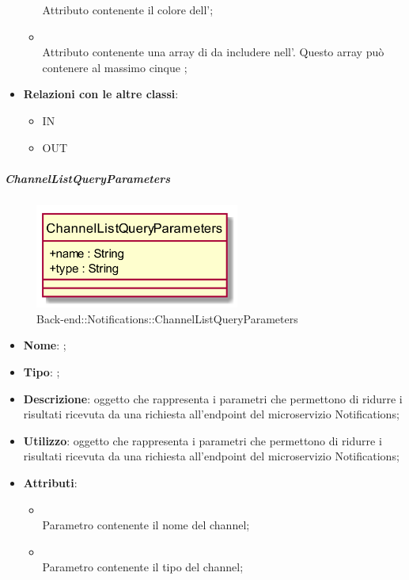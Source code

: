 \begin{itemize}
\begin{itemize}
		Attributo contenente il colore dell';
		\item[]  \\
		Attributo contenente una array di  da includere nell'. Questo array può contenere al massimo cinque ;
	\end{itemize}
	\item \textbf{Relazioni con le altre classi}:
	\begin{itemize}
		\item IN \hyperlink{NotificationMessage_label}{}
		\item OUT \hyperlink{Action_label}{}
	\end{itemize}
\end{itemize}
\FloatBarrier

\hypertarget{ChannelListQueryParameters_label}{\subparagraph{ChannelListQueryParameters}}
\begin{figure}[h]
	\centering
	\includegraphics[width=0.60\textwidth,height=\textheight,keepaspectratio]{images/ClassChannelListQueryParameters.png}
	\caption{Back-end::Notifications::ChannelListQueryParameters}
\end{figure}
\begin{itemize}
	\item \textbf{Nome}: ;
	\item \textbf{Tipo}: ;
	\item \textbf{Descrizione}: oggetto che rappresenta i parametri che permettono di ridurre i risultati ricevuta da una richiesta all'endpoint  del microservizio Notifications;
	\item \textbf{Utilizzo}: oggetto che rappresenta i parametri che permettono di ridurre i risultati ricevuta da una richiesta all'endpoint  del microservizio Notifications;
	\item \textbf{Attributi}:
	\begin{itemize}
		\item[]  \\
		Parametro contenente il nome del channel;
		\item[]  \\
		Parametro contenente il tipo del channel;
	\end{itemize}
\end{itemize}
\FloatBarrier

